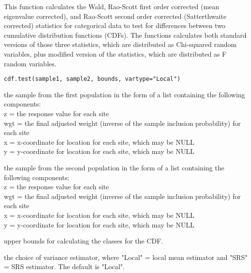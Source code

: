 \begin{Description}\relax
This function calculates the Wald, Rao-Scott first order corrected (mean 
eigenvalue corrected), and Rao-Scott second order corrected (Satterthwaite
corrected) statistics for categorical data to test for differences between two
cumulative distribution functions (CDFs).  The functions calculates both 
standard versions of those three statistics, which are distributed as 
Chi-squared random variables, plus modified version of the statistics, which 
are distributed as F random variables.
\end{Description}
\begin{Usage}
\begin{verbatim}
cdf.test(sample1, sample2, bounds, vartype="Local")
\end{verbatim}
\end{Usage}
\begin{Arguments}
\begin{ldescription}
\item[\code{sample1}] the sample from the first population in the form of a list
containing the following components:\\
z = the response value for each site\\
wgt = the final adjusted weight (inverse of the sample inclusion probability) for each site\\
x = x-coordinate for location for each site, which may be NULL\\
y = y-coordinate for location for each site, which may be NULL
\item[\code{sample2}] the sample from the second population in the form of a list
containing the following components:\\
z = the response value for each site\\
wgt = the final adjusted weight (inverse of the sample inclusion probability) for each site\\
x = x-coordinate for location for each site, which may be NULL\\
y = y-coordinate for location for each site, which may be NULL
\item[\code{bounds}] upper bounds for calculating the classes for the CDF.
\item[\code{vartype}] the choice of variance estimator, where "Local" = local mean
estimator and "SRS" = SRS estimator.  The default is "Local".
\end{ldescription}
\end{Arguments}
